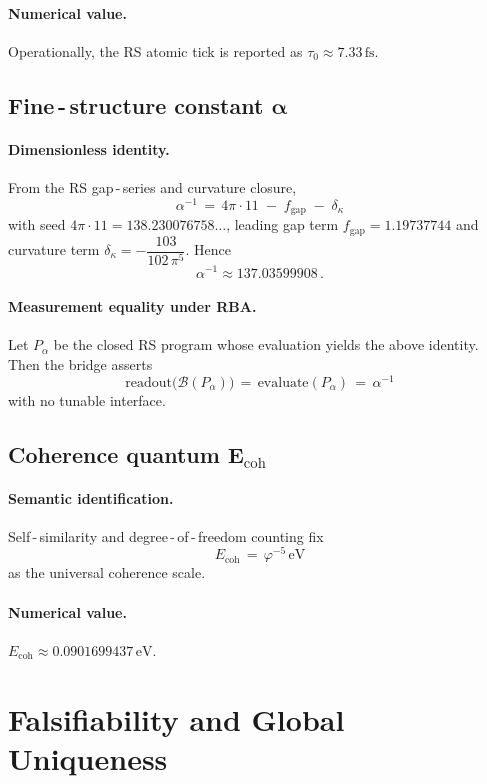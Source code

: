 \documentclass[11pt]{article}
\newcommand{\ph}{\varphi}
\newcommand{\tauzero}{\tau_{0}}
\newcommand{\Ecoh}{E_{\mathrm{coh}}}
\theoremstyle{remark}
\begin{document}
\paragraph{Numerical value.}
Operationally, the RS atomic tick is reported as \(\tauzero \approx 7.33\,\mathrm{fs}\).

\subsection*{Fine\,\mbox{-}\,structure constant $\boldsymbol{\alpha}$}
\paragraph{Dimensionless identity.}
From the RS gap\,\mbox{-}\,series and curvature closure,
\[
  \boxed{\;\alpha^{-1} \,=\, 4\pi\cdot 11\; -\; f_{\mathrm{gap}}\; -\; \delta_{\kappa}\;}
\]
with seed $4\pi\cdot 11 = 138.230076758\ldots$, leading gap term \(f_{\mathrm{gap}} = 1.19737744\) and curvature term \(\delta_{\kappa} = -\dfrac{103}{102\,\pi^{5}}\). Hence
\[
  \alpha^{-1} \approx 137.03599908\,.
\]
\paragraph{Measurement equality under RBA.}
Let $P_{\alpha}$ be the closed RS program whose evaluation yields the above identity. Then the bridge asserts
\[
  \boxed{\;\text{readout}\bigl(\mathcal B(P_{\alpha})\bigr) \,=\, \text{evaluate}(P_{\alpha}) \,=\, \alpha^{-1}\;}
\]
with no tunable interface.

\subsection*{Coherence quantum $\boldsymbol{\Ecoh}$}
\paragraph{Semantic identification.}
Self\,\mbox{-}\,similarity and degree\,\mbox{-}\,of\,\mbox{-}\,freedom counting fix
\[
  \boxed{\;\Ecoh \,=\, \ph^{-5}\,\mathrm{eV}\;}
\]
as the universal coherence scale.
\paragraph{Numerical value.}
\(\Ecoh \approx 0.0901699437\,\mathrm{eV}\).

\section{Falsifiability and Global Uniqueness}
\end{document}
